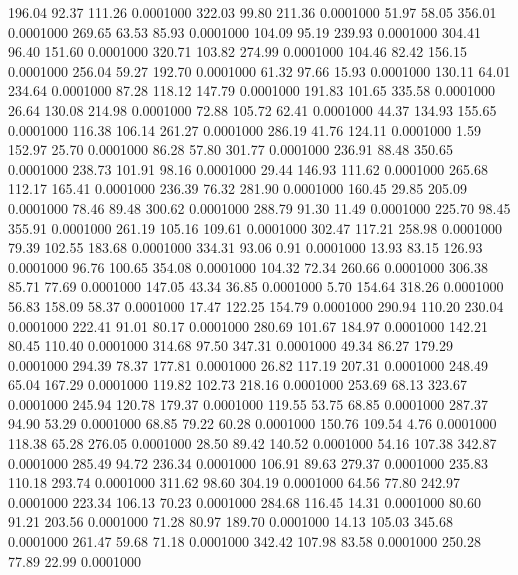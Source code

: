  196.04   92.37  111.26   0.0001000
 322.03   99.80  211.36   0.0001000
  51.97   58.05  356.01   0.0001000
 269.65   63.53   85.93   0.0001000
 104.09   95.19  239.93   0.0001000
 304.41   96.40  151.60   0.0001000
 320.71  103.82  274.99   0.0001000
 104.46   82.42  156.15   0.0001000
 256.04   59.27  192.70   0.0001000
  61.32   97.66   15.93   0.0001000
 130.11   64.01  234.64   0.0001000
  87.28  118.12  147.79   0.0001000
 191.83  101.65  335.58   0.0001000
  26.64  130.08  214.98   0.0001000
  72.88  105.72   62.41   0.0001000
  44.37  134.93  155.65   0.0001000
 116.38  106.14  261.27   0.0001000
 286.19   41.76  124.11   0.0001000
   1.59  152.97   25.70   0.0001000
  86.28   57.80  301.77   0.0001000
 236.91   88.48  350.65   0.0001000
 238.73  101.91   98.16   0.0001000
  29.44  146.93  111.62   0.0001000
 265.68  112.17  165.41   0.0001000
 236.39   76.32  281.90   0.0001000
 160.45   29.85  205.09   0.0001000
  78.46   89.48  300.62   0.0001000
 288.79   91.30   11.49   0.0001000
 225.70   98.45  355.91   0.0001000
 261.19  105.16  109.61   0.0001000
 302.47  117.21  258.98   0.0001000
  79.39  102.55  183.68   0.0001000
 334.31   93.06    0.91   0.0001000
  13.93   83.15  126.93   0.0001000
  96.76  100.65  354.08   0.0001000
 104.32   72.34  260.66   0.0001000
 306.38   85.71   77.69   0.0001000
 147.05   43.34   36.85   0.0001000
   5.70  154.64  318.26   0.0001000
  56.83  158.09   58.37   0.0001000
  17.47  122.25  154.79   0.0001000
 290.94  110.20  230.04   0.0001000
 222.41   91.01   80.17   0.0001000
 280.69  101.67  184.97   0.0001000
 142.21   80.45  110.40   0.0001000
 314.68   97.50  347.31   0.0001000
  49.34   86.27  179.29   0.0001000
 294.39   78.37  177.81   0.0001000
  26.82  117.19  207.31   0.0001000
 248.49   65.04  167.29   0.0001000
 119.82  102.73  218.16   0.0001000
 253.69   68.13  323.67   0.0001000
 245.94  120.78  179.37   0.0001000
 119.55   53.75   68.85   0.0001000
 287.37   94.90   53.29   0.0001000
  68.85   79.22   60.28   0.0001000
 150.76  109.54    4.76   0.0001000
 118.38   65.28  276.05   0.0001000
  28.50   89.42  140.52   0.0001000
  54.16  107.38  342.87   0.0001000
 285.49   94.72  236.34   0.0001000
 106.91   89.63  279.37   0.0001000
 235.83  110.18  293.74   0.0001000
 311.62   98.60  304.19   0.0001000
  64.56   77.80  242.97   0.0001000
 223.34  106.13   70.23   0.0001000
 284.68  116.45   14.31   0.0001000
  80.60   91.21  203.56   0.0001000
  71.28   80.97  189.70   0.0001000
  14.13  105.03  345.68   0.0001000
 261.47   59.68   71.18   0.0001000
 342.42  107.98   83.58   0.0001000
 250.28   77.89   22.99   0.0001000
